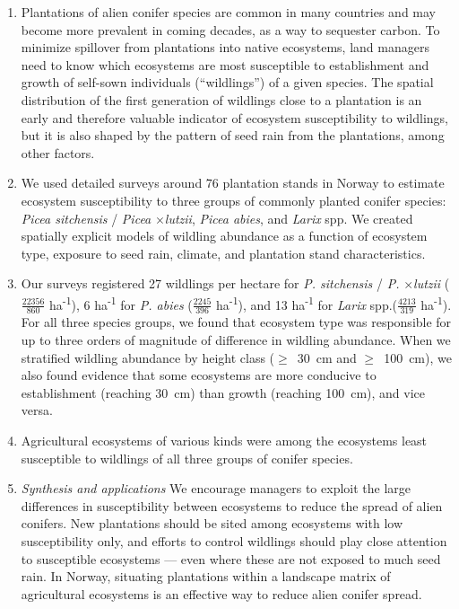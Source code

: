 \documentclass[
]{article}
\begin{document}
\begin{enumerate}
\def\labelenumi{\arabic{enumi}.}
\item
  Plantations of alien conifer species are common in many countries and may
  become more prevalent in coming decades, as a way to sequester carbon. To
  minimize spillover from plantations into native ecosystems, land managers
  need to know which ecosystems are most susceptible to establishment and
  growth of self-sown individuals (``wildlings'') of a given species. The
  spatial distribution of the first generation of wildlings close to a
  plantation is an early and therefore valuable indicator of ecosystem
  susceptibility to wildlings, but it is also shaped by the pattern of seed
  rain from the plantations, among other factors.
\item
  We used detailed surveys around 76 plantation stands in Norway to estimate
  ecosystem susceptibility to three groups of commonly planted conifer
  species: \emph{Picea sitchensis} / \emph{Picea} \(\times\)\emph{lutzii}, \emph{Picea abies}, and
  \emph{Larix} spp. We created spatially explicit models of wildling abundance as a
  function of ecosystem type, exposure to seed rain, climate, and plantation
  stand characteristics.
\item
  Our surveys registered 27 wildlings per hectare for \emph{P. sitchensis} / \emph{P.}
  \(\times\)\emph{lutzii} (\(\frac{22356}{860}\) ha\textsuperscript{-1}), 6 ha\textsuperscript{-1} for \emph{P. abies}
  (\(\frac{2245}{396}\) ha\textsuperscript{-1}), and 13 ha\textsuperscript{-1} for \emph{Larix}
  spp.(\(\frac{4213}{319}\) ha\textsuperscript{-1}). For all three species groups, we found that
  ecosystem type was responsible for up to three orders of magnitude of
  difference in wildling abundance. When we stratified wildling abundance by
  height class (\(\geq\)~30~cm and \(\geq\)~100~cm), we also found evidence that
  some ecosystems are more conducive to establishment (reaching 30~cm) than
  growth (reaching 100~cm), and vice versa.
\item
  Agricultural ecosystems of various kinds were among the ecosystems least
  susceptible to wildlings of all three groups of conifer species.
\item
  \emph{Synthesis and applications} We encourage managers to exploit the large
  differences in susceptibility between ecosystems to reduce the spread of
  alien conifers. New plantations should be sited among ecosystems with low
  susceptibility only, and efforts to control wildlings should play close
  attention to susceptible ecosystems --- even where these are not exposed to
  much seed rain. In Norway, situating plantations within a landscape matrix
  of agricultural ecosystems is an effective way to reduce alien conifer
  spread.
\end{enumerate}
\end{document}

